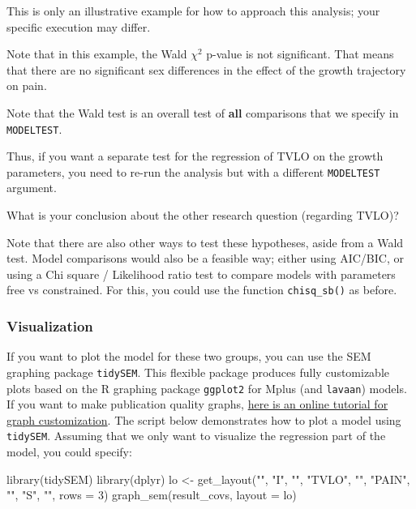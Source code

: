 \documentclass[
]{book}
\newenvironment{Shaded}{\begin{snugshade}}{\end{snugshade}}
\newcommand{\AttributeTok}[1]{\textcolor[rgb]{0.77,0.63,0.00}{#1}}
\newcommand{\DecValTok}[1]{\textcolor[rgb]{0.00,0.00,0.81}{#1}}
\newcommand{\FunctionTok}[1]{\textcolor[rgb]{0.00,0.00,0.00}{#1}}
\newcommand{\NormalTok}[1]{#1}
\newcommand{\OtherTok}[1]{\textcolor[rgb]{0.56,0.35,0.01}{#1}}
\newcommand{\StringTok}[1]{\textcolor[rgb]{0.31,0.60,0.02}{#1}}
\begin{document}
This is only an illustrative example for how to approach this analysis; your specific execution may differ.

Note that in this example, the Wald \(\chi^2\) p-value is not significant.
That means that there are no significant sex differences in the effect of the growth trajectory on pain.

Note that the Wald test is an overall test of \textbf{all}
comparisons that we specify in \texttt{MODELTEST}.

Thus, if you want a separate test for the regression of TVLO on the growth parameters,
you need to re-run the analysis but with a different \texttt{MODELTEST} argument.

What is your conclusion about the other research question (regarding TVLO)?

Note that there are also other ways to test these hypotheses, aside from a Wald test.
Model comparisons would also be a feasible way; either using AIC/BIC, or using a Chi square / Likelihood ratio test to compare models with parameters free vs constrained.
For this, you could use the function \texttt{chisq\_sb()} as before.

\hypertarget{visualization}{%
\subsubsection{Visualization}\label{visualization}}

If you want to plot the model for these two groups,
you can use the SEM graphing package \texttt{tidySEM}.
This flexible package produces fully customizable plots based on the R graphing package \texttt{ggplot2} for Mplus (and \texttt{lavaan}) models.
If you want to make publication quality graphs, \href{https://cjvanlissa.github.io/tidySEM/articles/Plotting_graphs.html}{here is an online tutorial for graph customization}.
The script below demonstrates how to plot a model using \texttt{tidySEM}. Assuming that we only want to visualize the regression part of the model, you could specify:

\begin{Shaded}
\begin{Highlighting}[]
\FunctionTok{library}\NormalTok{(tidySEM)}
\FunctionTok{library}\NormalTok{(dplyr)}
\NormalTok{lo }\OtherTok{\textless{}{-}} \FunctionTok{get\_layout}\NormalTok{(}\StringTok{""}\NormalTok{,     }\StringTok{"I"}\NormalTok{,   }\StringTok{""}\NormalTok{,}
                 \StringTok{"TVLO"}\NormalTok{, }\StringTok{""}\NormalTok{,   }\StringTok{"PAIN"}\NormalTok{,}
                 \StringTok{""}\NormalTok{,     }\StringTok{"S"}\NormalTok{,   }\StringTok{""}\NormalTok{, }\AttributeTok{rows =} \DecValTok{3}\NormalTok{)}
\FunctionTok{graph\_sem}\NormalTok{(result\_covs, }\AttributeTok{layout =}\NormalTok{ lo)}
\end{Highlighting}
\end{Shaded}
\end{document}
